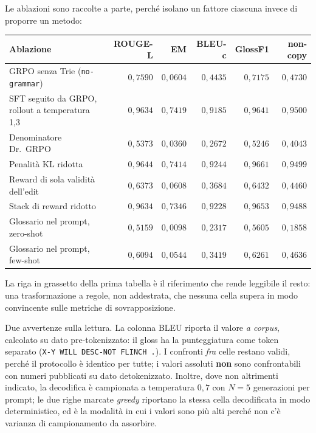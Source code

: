 Le ablazioni sono raccolte a parte, perché isolano un fattore ciascuna invece di
proporre un metodo:

\begin{center}
\begin{tabular}{lrrrrr}
\toprule
Ablazione & ROUGE-L & EM & BLEU-c & GlossF1 & non-copy \\
\midrule
GRPO senza Trie (\texttt{no-grammar}) & $0{,}7590$ & $0{,}0604$ & $0{,}4435$ & $0{,}7175$ & $0{,}4730$ \\
SFT seguito da GRPO, rollout a temperatura 1,3 & $0{,}9634$ & $0{,}7419$ & $0{,}9185$ & $0{,}9641$ & $0{,}9500$ \\
Denominatore Dr.\ GRPO & $0{,}5373$ & $0{,}0360$ & $0{,}2672$ & $0{,}5246$ & $0{,}4043$ \\
Penalità KL ridotta & $0{,}9644$ & $0{,}7414$ & $0{,}9244$ & $0{,}9661$ & $0{,}9499$ \\
Reward di sola validità dell'edit & $0{,}6373$ & $0{,}0608$ & $0{,}3684$ & $0{,}6432$ & $0{,}4460$ \\
Stack di reward ridotto & $0{,}9634$ & $0{,}7346$ & $0{,}9228$ & $0{,}9653$ & $0{,}9488$ \\
Glossario nel prompt, zero-shot & $0{,}5159$ & $0{,}0098$ & $0{,}2317$ & $0{,}5605$ & $0{,}1858$ \\
Glossario nel prompt, few-shot & $0{,}6094$ & $0{,}0544$ & $0{,}3419$ & $0{,}6261$ & $0{,}4636$ \\
\bottomrule
\end{tabular}
\end{center}

La riga in grassetto della prima tabella è il riferimento che rende leggibile il
resto: una trasformazione a regole, non addestrata, che nessuna cella supera in
modo convincente sulle metriche di sovrapposizione.

Due avvertenze sulla lettura. La colonna BLEU riporta il valore \emph{a corpus},
calcolato su dato pre-tokenizzato: il gloss ha la punteggiatura come token
separato (\texttt{X-Y WILL DESC-NOT FLINCH .}). I confronti \emph{fra} celle
restano validi, perché il protocollo è identico per tutte; i valori assoluti
\textbf{non} sono confrontabili con numeri pubblicati su dato detokenizzato.
Inoltre, dove non altrimenti indicato, la decodifica è campionata a temperatura
$0{,}7$ con $N=5$ generazioni per prompt; le due righe marcate \emph{greedy}
riportano la stessa cella decodificata in modo deterministico, ed è la modalità
in cui i valori sono più alti perché non c'è varianza di campionamento da
assorbire.

